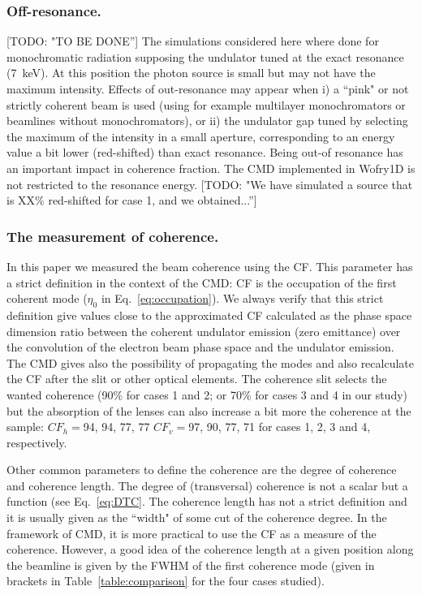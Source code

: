 \documentclass{iucr}              %
\newcommand{\todo}[1]{{\color{red}[TODO: "#1'']}}
\begin{document}
\subsubsection{Off-resonance.}\todo{TO BE DONE} The simulations considered here where done for monochromatic radiation supposing the undulator tuned at the exact resonance (\SI{7}{keV}). At this position the photon source is small but may not have the maximum intensity. Effects of out-resonance may appear when i) a ``pink" or not strictly coherent beam is used (using for example multilayer monochromators or beamlines without monochromators), or ii) the undulator gap tuned by selecting the maximum of the intensity in a small aperture, corresponding to an energy value a bit lower (red-shifted) than exact resonance. Being out-of resonance has an important impact in coherence fraction. The CMD implemented in Wofry1D is not restricted to the resonance energy. 
\todo{We have simulated a source that is XX\% red-shifted for case 1, and we obtained...}

\subsubsection{The measurement of coherence.} In this paper we measured the beam coherence using the CF. This parameter has a strict definition in the context of the CMD: CF is the occupation of the first coherent mode ($\eta_0$ in Eq.~\ref{eq:occupation}). We always verify that this strict definition give values close to the approximated CF  calculated as the phase space dimension ratio between the coherent undulator emission (zero emittance) over the convolution of the electron beam phase space and the undulator emission. The CMD gives also the possibility of propagating the modes and also recalculate the CF after the slit or other optical elements. The coherence slit selects the wanted coherence (90\% for cases 1 and 2; or 70\% for cases 3 and 4 in our study) but the absorption of the lenses can also increase a bit more the coherence at the sample: $CF_h=$94, 94, 77, 77 $CF_v=$97, 90, 77, 71 for cases 1, 2, 3 and 4, respectively. 

Other common parameters to define the coherence are the degree of coherence and coherence length. The degree of (transversal) coherence is not a scalar but a function (see Eq.~\ref{eq:DTC}. The coherence length has not a strict definition and it is usually given as the ``width" of some cut of the coherence degree. In the framework of CMD, it is more practical to use the CF as a measure of the coherence. However, a good idea of the coherence length at a given position along the beamline is given by the FWHM of the first coherence mode (given in brackets in Table~\ref{table:comparison} for the four cases studied).    
\end{document}
